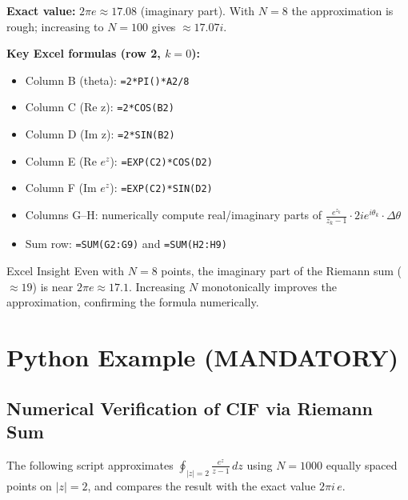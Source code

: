 \documentclass[12pt,a4paper]{article}
\begin{document}
\textbf{Exact value:} $2\pi e \approx 17.08$ (imaginary part).
With $N = 8$ the approximation is rough; increasing to $N = 100$ gives $\approx 17.07i$.

\medskip

\textbf{Key Excel formulas (row 2, $k=0$):}
\begin{itemize}[noitemsep]
  \item Column B (theta): \texttt{=2*PI()*A2/8}
  \item Column C (Re z): \texttt{=2*COS(B2)}
  \item Column D (Im z): \texttt{=2*SIN(B2)}
  \item Column E (Re $e^z$): \texttt{=EXP(C2)*COS(D2)}
  \item Column F (Im $e^z$): \texttt{=EXP(C2)*SIN(D2)}
  \item Columns G--H: numerically compute real/imaginary parts of $\frac{e^{z_k}}{z_k-1}\cdot 2ie^{i\theta_k}\cdot\Delta\theta$
  \item Sum row: \texttt{=SUM(G2:G9)} and \texttt{=SUM(H2:H9)}
\end{itemize}

\begin{learnbox}{Excel Insight}
Even with $N = 8$ points, the imaginary part of the Riemann sum ($\approx 19$) is near
$2\pi e \approx 17.1$.  Increasing $N$ monotonically improves the approximation,
confirming the formula numerically.
\end{learnbox}

\section{Python Example (MANDATORY)}

\subsection*{Numerical Verification of CIF via Riemann Sum}

The following script approximates $\displaystyle\oint_{|z|=2}\frac{e^z}{z-1}\,dz$
using $N = 1000$ equally spaced points on $|z| = 2$,
and compares the result with the exact value $2\pi i\,e$.
\end{document}

